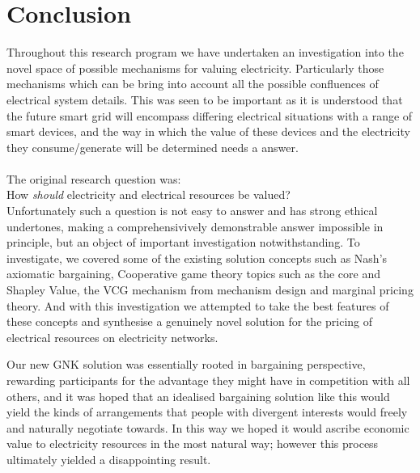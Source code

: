 \chapter{Conclusion}
\label{cha:conc}

Throughout this research program we have undertaken an investigation into the novel space of possible mechanisms for valuing electricity. Particularly those mechanisms which can be bring into account all the possible confluences of electrical system details.
This was seen to be important as it is understood that the future smart grid will encompass differing electrical situations with a range of smart devices, and the way in which the value of these devices and the electricity they consume/generate will be determined needs a answer.\\
\\\noindent
The original research question was:\\
\-\hspace{1cm}How \textit{should} electricity and electrical resources be valued?\\

Unfortunately such a question is not easy to answer and has strong ethical undertones, making a comprehensivively demonstrable answer impossible in principle, but an object of important investigation notwithstanding.
To investigate, we covered some of the existing solution concepts such as Nash's axiomatic bargaining, Cooperative game theory topics such as the core and Shapley Value, the VCG mechanism from mechanism design and marginal pricing theory.
And with this investigation we attempted to take the best features of these concepts and synthesise a genuinely novel solution for the pricing of electrical resources on electricity networks.

Our new GNK solution was essentially rooted in bargaining perspective, rewarding participants for the advantage they might have in competition with all others, 
and it was hoped that an idealised bargaining solution like this would yield the kinds of arrangements that people with divergent interests would freely and naturally negotiate towards.
In this way we hoped it would ascribe economic value to electricity resources in the most natural way; however this process ultimately yielded a disappointing result.


